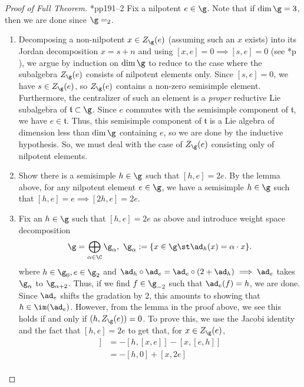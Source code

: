 \begin{proof}[Proof of Full Theorem]
  \cite{cg}*{pp191--2} Fix a nilpotent \(e \in \g\). Note that if
  \(\dim \g = 3\), then we 
  are done since \(\g = \sl_2\).
  \begin{enumerate}[label=(\arabic*)]
  \item Decomposing a non-nilpotent \(x \in Z_\g(e)\) (assuming such
    an \(x\) exists) into its Jordan
    decomposition \(x = s+n\) and using \([x,e] = 0 \implies
    [s,e]=0\) (see \cite{humph}*{p } ), we argue by induction on \(\dim
    \g\) to reduce to the case where 
    the subalgebra \(Z_\g(e)\) consists of nilpotent elements
    only. Since \([s,e] = 0\), we have \(s \in Z_\g(e)\), so
    \(Z_\g(e)\) contains a non-zero semisimple element. Furthermore,
    the centralizer of such an element is a \emph{proper} reductive
    Lie subalgebra of \(\mathfrak{t} \subset \g\). Since \(e\) commutes
    with the semisimple component of \(\mathfrak{t}\), we have \(e \in
    \mathfrak{t}\). Thus, this semisimple component of
    \(\mathfrak{t}\) is a Lie algebra of dimension less than \(\dim
    \g\) containing \(e\), so we are done by the inductive
    hypothesis. So, we must deal with the case of \(Z_\g(e)\)
    consisting only of nilpotent elements.
  \item Show there is a semisimple \(h \in \g\) such that \([h,e]=2e\). By the
    lemma above, for any nilpotent element \(e \in \g\), we have
    a semisimple \(h \in \g\) such that \([h,e] = e \implies [2h,e] = 2e\).
  \item Fix an \(h \in \g\) such that \([h,e]=2e\) as above and introduce
    weight space decomposition \[
      \g = \bigoplus_{\alpha \in \C} \g_\alpha, \ \g_\alpha := \{x \in
      \g \st \ad_h(x) = \alpha \cdot x\}.
    \]
    where \(h \in \g_0, e \in \g_2\) and \(\ad_h \circ \ad_e = \ad_e
    \circ (2+ \ad_h) \implies \ad_e\) takes \(\g_\alpha\) to
    \(\g_{\alpha+2}\). Thus, if we find \(f \in \g_{-2}\) such that
    \(\ad_e(f) = h\), we are done. Since \(\ad_e\) shifts the
    gradation by \(2\), this amounts to showing that \(h \in
    \im(\ad_e)\). However, from the
    lemma in the proof above, we see this holds if and only if
    \((h,Z_\g(e)) = 0\). To prove this, we use the Jacobi identity and
    the fact that \([h,e]=2e\) to get that, for \(x \in Z_\g(e)\),
    \begin{align*}
      [e,[h,x]] & = -[h,[x,e]]-[x,[e,h]] \\
                & = -[h,0] + [x,2e] \\

\end{align*}
\end{enumerate}
\end{proof}
